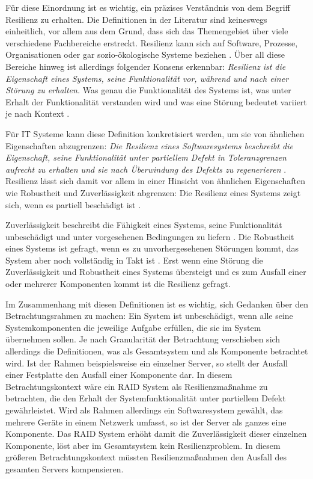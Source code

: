 \documentclass[]{lni}
\begin{document}
Für diese Einordnung ist es wichtig, ein präzises Verständnis von dem Begriff Resilienz zu erhalten. Die Definitionen in der Literatur sind keineswegs einheitlich, vor allem aus dem Grund, dass sich das Themengebiet über viele verschiedene Fachbereiche erstreckt. Resilienz kann sich auf Software, Prozesse, Organisationen oder gar sozio-ökologische Systeme beziehen \cite[279]{Hickford.2018}. Über all diese Bereiche hinweg ist allerdings folgender Konsens erkennbar: \textit{Resilienz ist die Eigenschaft eines Systems, seine Funktionalität vor, während und nach einer Störung zu erhalten.} Was genau die Funktionalität des Systems ist, was unter \glqq Erhalt der Funktionalität\grqq{} verstanden wird und was eine Störung bedeutet variiert je nach Kontext \cite[279]{Hickford.2018}.

Für IT Systeme kann diese Definition konkretisiert werden, um sie von ähnlichen Eigenschaften abzugrenzen: \textit{Die Resilienz eines Softwaresystems beschreibt die Eigenschaft, seine Funktionalität unter partiellem Defekt in Toleranzgrenzen aufrecht zu erhalten und sie nach Überwindung des Defekts zu regenerieren} \cite[99]{Zhang.2010}. Resilienz lässt sich damit vor allem in einer Hinsicht von ähnlichen Eigenschaften wie Robustheit und Zuverlässigkeit abgrenzen: Die Resilienz eines Systems zeigt sich, wenn es partiell beschädigt ist \cite[99]{Zhang.2010}. 

Zuverlässigkeit beschreibt die Fähigkeit eines Systems, seine Funktionalität unbeschädigt und unter vorgesehenen Bedingungen zu liefern \cite[100]{Zhang.2010}. Die Robustheit eines Systems ist gefragt, wenn es zu unvorhergesehenen Störungen kommt, das System aber noch vollständig in Takt ist \cite[100]{Zhang.2010}. Erst wenn eine Störung die Zuverlässigkeit und Robustheit eines Systems übersteigt und es zum Ausfall einer oder mehrerer Komponenten kommt ist die Resilienz gefragt.

Im Zusammenhang mit diesen Definitionen ist es wichtig, sich Gedanken über den Betrachtungsrahmen zu machen: Ein System ist unbeschädigt, wenn alle seine Systemkomponenten die jeweilige Aufgabe erfüllen, die sie im System übernehmen sollen. Je nach Granularität der Betrachtung verschieben sich allerdings die Definitionen, was als \glqq Gesamtsystem\grqq{} und als \glqq Komponente\grqq{} betrachtet wird. Ist der Rahmen beispielsweise ein einzelner Server, so stellt der Ausfall einer Festplatte den Ausfall einer Komponente dar. In diesem Betrachtungskontext wäre ein RAID System als Resilienzmaßnahme zu betrachten, die den Erhalt der Systemfunktionalität unter partiellem Defekt gewährleistet. Wird als Rahmen allerdings ein Softwaresystem gewählt, das mehrere Geräte in einem Netzwerk umfasst, so ist der Server als ganzes eine Komponente. Das RAID System erhöht damit die Zuverlässigkeit dieser einzelnen Komponente, löst aber im Gesamtsystem kein Resilienzproblem. In diesem größeren Betrachtungskontext müssten Resilienzmaßnahmen den Ausfall des gesamten Servers kompensieren.
\end{document}
